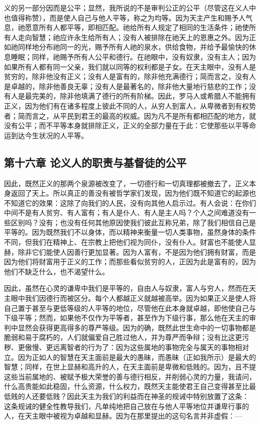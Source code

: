 义的另一部分因而是公平；显然，我所说的不是审判公正的公平（尽管这在义人中也值得称赞），而是使人自己与他人平等，称之为均等。因为天主产生和赐予人气息，祂愿意所有人都平等，即相匹配。祂给所有人规定了相同的生活条件；祂使所有人走向智慧；祂应许永生给所有人；没有人被排除在祂天上的恩惠之外。因为正如祂同样地分布祂同一的光，赐予所有人祂的泉水，供给食物，并给予最愉快的休息睡眠；同样，祂赐予所有人公平和德行。在祂眼中，没有奴隶，没有主人；因为如果所有人都有同一父亲，我们就以同等的权利都是子女。在天主眼中，没有人是贫穷的，除非他没有正义；没有人是富有的，除非他充满德行；简而言之，没有人是卓越的，除非他善良无辜；没有人是最著名的，除非他大量地行慈悲的工作；没有人是最完美的，除非他填满了德行的所有阶梯。因此，罗马人或希腊人不能拥有正义，因为他们有在诸多程度上彼此不同的人，从穷人到富人，从卑微者到有权势者；简而言之，从平民到君王的最高的权威。因为凡不是所有都相匹配的地方，就没有公平；而不平等本身就排除正义，正义的全部力量在于此：它使那些以平等命运到达今生状况的人平等。\par


\subsection{第十六章 论义人的职责与基督徒的公平}

因此，既然正义的那两个泉源被改变了，一切德行和一切真理都被撤去了，正义本身返回了天上。所以真正的善没有被哲学家们发现，因为他们既不知道它的起源也不知道它的效果：这除了向我们的人民，没有向其他人启示过。有人会说：在你们中间不是有人贫穷、有人富有；有人是仆人、有人是主人吗？个人之间难道没有一些区别吗？没有；也没有任何其他原因使我们彼此互称兄弟，除了我们相信自己是平等的。因为既然我们不以身体，而以精神来衡量一切人类事物，虽然身体的条件不同，但我们在精神上、在宗教上把他们视为同仆，没有仆人。财富也不能使人显赫，除非它们能使人因善行更加显著。因为人富有，不是因为他们拥有财富，而是因为他们将财富用于正义的工作；而那些看似贫穷的人，正因为此是富有的，因为他们不缺乏什么，也不渴望什么。\par

因此，虽然在心灵的谦卑中我们是平等的，自由人与奴隶，富人与穷人，然而在天主眼中我们因德行而被区分。每个人都越正义就越被高举。因为如果正义是使人将自己置于甚至与更低等级的人平等的地位，尽管他在此本身就卓越，即他使自己与下级平等；然而，如果他不仅作为平等者，甚至作为下级行事，那么他在天主的审判中显然会获得更高得多的尊严等级。因为的确，既然此世生命中的一切事物都是脆弱和易于腐朽的，人们就偏爱自己胜过他人，并为尊严而争辩；没有比这更污秽、更傲慢、更远离智者的行为了：因为这些属地的事物完全与属天的事物相对立。因为正如人的智慧在天主面前是最大的愚昧，而愚昧（正如我所示）是最大的智慧；同样，在世上显赫和高升的人，在天主面前是卑微和低贱的。因为，且不提这些当前属地的、被赋予极大荣誉的善与德行相反，并削弱心灵的力量，我请问，什么高贵能如此稳固，什么资源，什么权力，既然天主能使君王自己变得甚至比最低贱的人还要低贱？因此天主为我们的利益而在神圣的规诫中特别放置了这条： 这条规诫的健全性教导我们，凡单纯地把自己放在与他人平等地位并谦卑行事的人，在天主眼中被视为卓越和显赫。因为在那里提出的这句名言并非虚假：—\par

